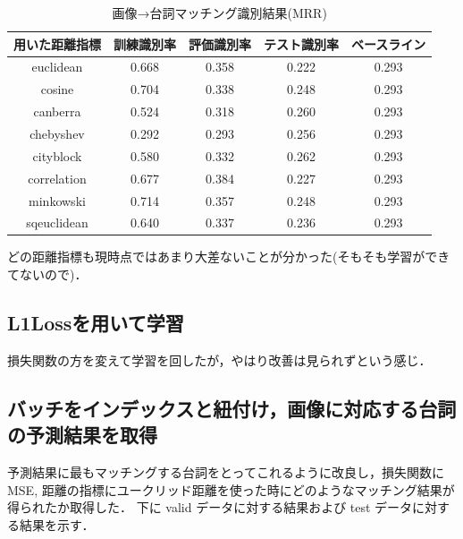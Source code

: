 \documentclass[onecolumn]{ujarticle}   %
\begin{document}
	\begin{table}[h]
		\vspace{-3mm}
		\centering
		\caption{画像→台詞マッチング識別結果(MRR)}
		\label{tab:result}
		\begin{tabular}{|c|c|c|c|c|} \hline
			用いた距離指標&訓練識別率&評価識別率&テスト識別率&ベースライン\\ \hline\hline
			euclidean&0.668&0.358&0.222&0.293\\ \hline
			cosine&0.704&0.338&0.248&0.293\\ \hline
			canberra&0.524&0.318&0.260&0.293\\ \hline
			chebyshev&0.292&0.293&0.256&0.293\\ \hline
			cityblock&0.580&0.332&0.262&0.293\\ \hline
			correlation&0.677&0.384&0.227&0.293\\ \hline
			minkowski&0.714&0.357&0.248&0.293\\ \hline
			sqeuclidean&0.640&0.337&0.236&0.293\\ \hline
		\end{tabular}
	\end{table}

	どの距離指標も現時点ではあまり大差ないことが分かった(そもそも学習ができてないので)．

	\subsection{L1Lossを用いて学習}
	損失関数の方を変えて学習を回したが，やはり改善は見られずという感じ．

	\subsection{バッチをインデックスと紐付け，画像に対応する台詞の予測結果を取得}
	予測結果に最もマッチングする台詞をとってこれるように改良し，損失関数に MSE, 距離の指標にユークリッド距離を使った時にどのようなマッチング結果が得られたか取得した．
	下に valid データに対する結果および test データに対する結果を示す．
\end{document}
